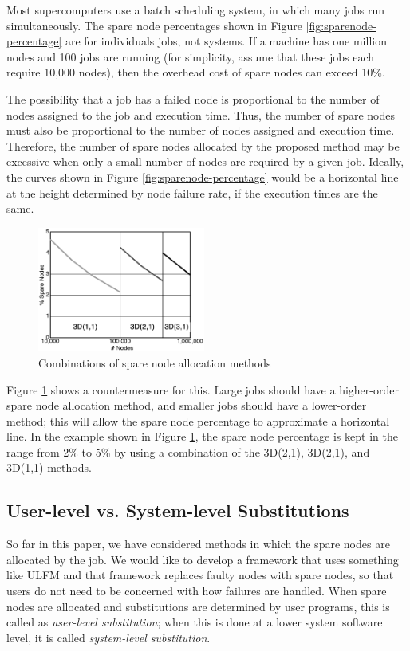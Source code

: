 \documentclass[Afour,times,sagev]{sagej}
\begin{document}
Most supercomputers use a batch scheduling system, in which many jobs
run simultaneously. The spare node percentages shown in Figure
\ref{fig:sparenode-percentage} are for individuals jobs, not
systems. If a machine has one million nodes and 100 jobs are running
(for simplicity, assume that these jobs each require 10,000 nodes),
then the overhead cost of spare nodes can exceed 10\%.

The possibility that a job has a failed node is proportional to the
number of nodes assigned to the job and execution time. Thus, the
number of spare nodes must also be proportional to the number of nodes
assigned and execution time. Therefore, the number of spare nodes
allocated by the proposed method may be excessive when only a small
number of nodes are required by a given job. Ideally, the curves shown
in Figure \ref{fig:sparenode-percentage} would be a horizontal line at
the height determined by node failure rate, if the execution times are
the same.

\begin{figure}[ht]
\centering
\includegraphics[width=55mm]{Figs/R-SpareNodes-combo.eps}
  \caption{Combinations of spare node allocation methods}
  \label{fig:combo-percentage}
\end{figure}

Figure \ref{fig:combo-percentage} shows a countermeasure for
this. Large jobs should have a higher-order spare node allocation
method, and smaller jobs should have a lower-order method; this will
allow the spare node percentage to approximate a horizontal line. In
the example shown in Figure \ref{fig:combo-percentage}, the spare node
percentage is kept in the range from 2\% to 5\% by using a combination
of the 3D(2,1), 3D(2,1), and 3D(1,1) methods.

\subsection{User-level vs. System-level Substitutions}

So far in this paper, we have considered methods in which the spare
nodes are allocated by the job. We would like to develop a framework
that uses something like ULFM and that framework replaces
faulty nodes with spare nodes, so that users do not need to be
concerned with how failures are handled. When spare nodes are
allocated and substitutions are determined by user programs, this is
called as {\it user-level substitution}; when this is done at a lower
system software level, it is called {\it system-level substitution}.
\end{document}

